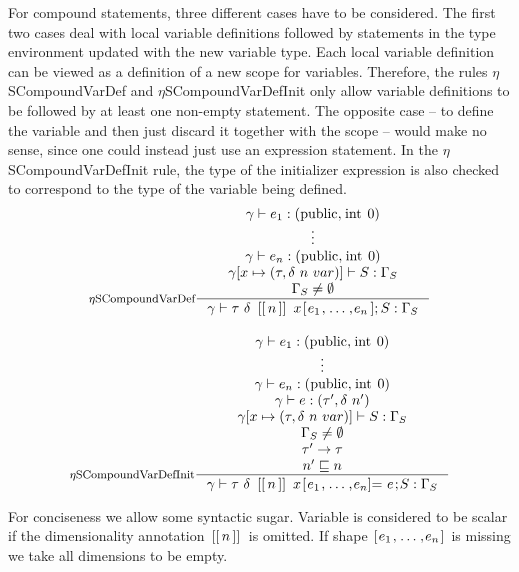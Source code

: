 \documentclass[a4paper, 10pt, draft]{report}
\newcommand{\mycode}[1]{\ensuremath{\mbox{\lstinline{#1}}}}
\begin{document}
For compound statements, three different cases have to be considered. The first
two cases deal with local variable definitions followed by statements in the
type environment updated with the new variable type. Each local variable
definition can be viewed as a definition of a new scope for variables.
Therefore, the rules $\eta$SCompoundVarDef and $\eta$SCompoundVarDefInit only
allow variable definitions to be followed by at least one non-empty statement.
The opposite case -- to define the variable and then just discard it together
with the scope -- would make no sense, since one could instead just use an
expression statement. In the $\eta$SCompoundVarDefInit rule, the type of the
initializer expression is also checked to correspond to the type of the
variable being defined.
\[\begin{array}{c}
\inference[$\eta$SCompoundVarDef]{
  \gamma |- e_1 : \left( \mycode{public}, \mycode{int}\ 0 \right) \\
  \vdots \\
  \gamma |- e_n : \left( \mycode{public}, \mycode{int}\ 0 \right) \\
  \gamma[x \mapsto (\tau, \delta\ n\ var)] |- S : \Gamma_S \\
  \Gamma_S \neq \emptyset
}{
  \gamma |- \tau\ \delta\ \mycode{[[}n\mycode{]]}\ x\mycode{[} e_1 \mycode{,} \ldots \mycode{,} e_n \mycode{];} S : \Gamma_S
} \\[2em]
\inference[$\eta$SCompoundVarDefInit]{
  \gamma |- e_1 : \left( \mycode{public}, \mycode{int}\ 0 \right) \\
  \vdots \\
  \gamma |- e_n : \left( \mycode{public}, \mycode{int}\ 0 \right) \\
  \gamma |- e : \left( \tau', \delta\ n' \right) \\
  \gamma[x \mapsto (\tau, \delta\ n\ var)] |- S : \Gamma_S \\
  \Gamma_S \neq \emptyset \\
  \tau' \to \tau \\
  n' \sqsubseteq n
}{
  \gamma |- \tau\ \delta\ \mycode{[[}n\mycode{]]}\ x\mycode{[} e_1 \mycode{,} \ldots \mycode{,} e_n  \mycode{]=}\ e\mycode{;} S : \Gamma_S
}
\end{array}\]

For conciseness we allow some syntactic sugar. Variable is considered to be
scalar if the dimensionality annotation $\mycode{[[}n\mycode{]]}$ is omitted.
If shape $\mycode{[} e_1 \mycode{,} \ldots \mycode{,} e_n  \mycode{]}$ is
missing we take all dimensions to be empty.
\end{document}
